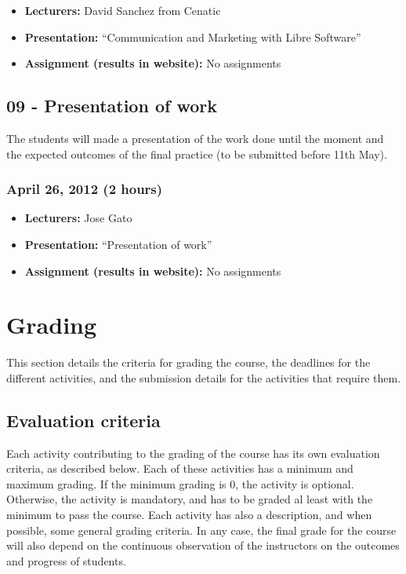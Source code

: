 \documentclass[a4paper]{article}
\begin{document}
\begin{itemize}
\item \textbf{Lecturers:} David Sanchez from Cenatic
\item \textbf{Presentation:} ``Communication and Marketing with Libre Software''
\item \textbf{Assignment (results in website):} No assignments
\end{itemize}


\subsection{09 - Presentation of work}

The students will made a presentation of the work done until the moment and the expected outcomes of the final practice (to be submitted before 11th May). 

\subsubsection{April 26, 2012 (2 hours)}

\begin{itemize}
\item \textbf{Lecturers:} Jose Gato
\item \textbf{Presentation:} ``Presentation of work''
\item \textbf{Assignment (results in website):} No assignments
\end{itemize}





\section{Grading}

This section details the criteria for grading the course, the
deadlines for the different activities, and the submission details for
the activities that require them.

\subsection{Evaluation criteria}
\label{sub:evaluation-criteria}

Each activity contributing to the grading of the course has its own
evaluation criteria, as described below. Each of these activities has
a minimum and maximum grading. If the minimum grading is 0, the
activity is optional. Otherwise, the activity is mandatory, and has to
be graded al least with the minimum to pass the course. Each activity
has also a description, and when possible, some general grading
criteria. In any case, the final grade for the course will also depend
on the continuous observation of the instructors on the outcomes and
progress of students.
\end{document}

